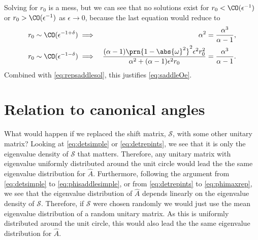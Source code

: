 \documentclass[12pt]{article}
\newcommand{\inv}{^{-1}}
\newcommand{\shift}{\mathcal{S}}
\newcommand{\aest}{\hat{A}}
\newcommand{\omo}{\prn{1-\abs{\omega}^2}}
\begin{document}
Solving for $r_0$ is a mess, but we can see that no solutions exist for $r_0<\CO(\epsilon\inv)$ or $r_0>\CO(\epsilon\inv)$ as $\epsilon\to0$, because the last equation would reduce to
\begin{equation}\label{eq:rOe}
\begin{aligned}
  r_0 &\sim \CO(\epsilon^{-1+\delta})
   \implies &
   \alpha^2 &= \frac{\alpha^3}{\alpha-1}, \\
  r_0 &\sim \CO(\epsilon^{-1-\delta})
   \implies &
   \frac{(\alpha-1)\omo^2\epsilon^2r_0^2}{\alpha^2+(\alpha-1)\epsilon^2r_0} &= \frac{\alpha^3}{\alpha-1}. \\
\end{aligned}
\end{equation}
%
Combined with \eqref{eq:repsaddlesol}, this justifies \eqref{eq:saddleOe}.


\section{Relation to canonical angles}\label{sec:canonang}

What would happen if we replaced the shift matrix, $\shift$, with some other unitary matrix?
Looking at \eqref{eq:detsimple} or \eqref{eq:detrepints}, we see that it is only the eigenvalue density of $\shift$ that matters.
Therefore, any unitary matrix with eigenvalue uniformly distributed around the unit circle would lead the the same eigenvalue distribution for $\aest$.
Furthermore, following the argument from \eqref{eq:detsimple} to \eqref{eq:phisaddlesimple}, or from \eqref{eq:detrepints} to \eqref{eq:phimaxrep}, we see that the eigenvalue distribution of $\aest$ depends linearly on the eigenvalue density of $\shift$.
Therefore, if $\shift$ were chosen randomly we would just use the mean eigenvalue distribution of a random unitary matrix.
As this is uniformly distributed around the unit circle, this would also lead the the same eigenvalue distribution for $\aest$.
\end{document}
